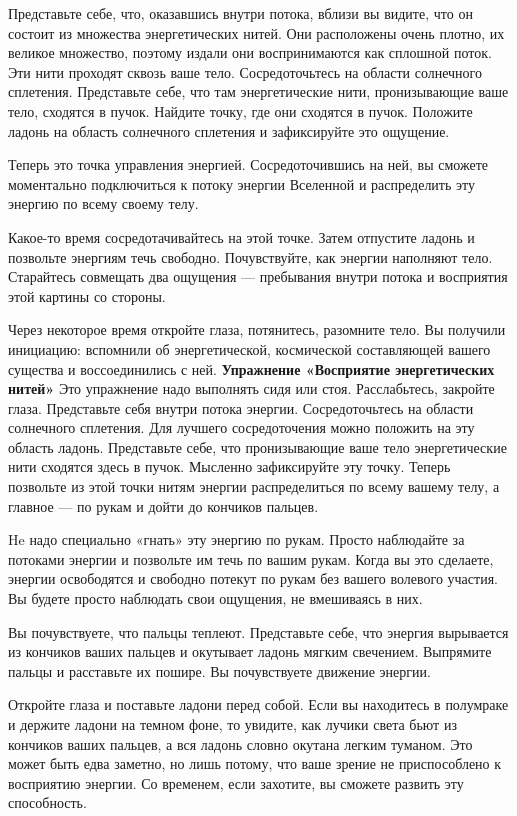 Представьте себе, что, оказавшись внутри потока, вблизи вы видите, что он состоит из множества
энергетических нитей. Они расположены очень плотно, их великое множество, поэтому издали они
воспринимаются как сплошной поток. Эти нити проходят сквозь ваше тело. Сосредоточьтесь на области солнечного сплетения. Представьте себе, что там энергетические нити, пронизывающие ваше тело, сходятся в пучок. Найдите точку, где они сходятся в пучок. Положите ладонь на область солнечного сплетения и зафиксируйте это ощущение.

Теперь это точка управления энергией. Сосредоточившись на ней, вы сможете моментально подключиться к потоку энергии Вселенной и распределить эту энергию по всему своему телу.

Какое-то время сосредотачивайтесь на этой точке. Затем отпустите ладонь и позвольте энергиям течь
свободно. Почувствуйте, как энергии наполняют тело. Старайтесь совмещать два ощущения --- пребывания внутри потока и восприятия этой картины со стороны.

Через некоторое время откройте глаза, потянитесь, разомните тело. Вы получили инициацию: вспомнили об энергетической, космической составляющей вашего существа и воссоединились с ней.
\bigskip
{\bf Упражнение «Восприятие энергетических нитей»}
\medskip
Это упражнение надо выполнять сидя или стоя. Расслабьтесь, закройте глаза. Представьте себя внутри потока энергии. Сосредоточьтесь на области солнечного сплетения. Для лучшего сосредоточения можно положить на эту область ладонь. Представьте себе, что пронизывающие ваше тело энергетические нити сходятся здесь в пучок. Мысленно зафиксируйте эту точку. Теперь позвольте из этой точки нитям энергии распределиться по всему вашему телу, а главное
--- по рукам и дойти до кончиков пальцев.

He надо специально «гнать» эту энергию по рукам. Просто наблюдайте за потоками энергии и позвольте им течь по вашим рукам. Когда вы это сделаете, энергии освободятся и свободно потекут по рукам без вашего волевого участия. Вы будете просто наблюдать свои ощущения, не вмешиваясь в них.

Вы почувствуете, что пальцы теплеют. Представьте себе, что энергия вырывается из кончиков ваших пальцев и окутывает ладонь мягким свечением. Выпрямите пальцы и расставьте их пошире. Вы почувствуете движение энергии.

Откройте глаза и поставьте ладони перед собой. Если вы находитесь в полумраке и держите ладони на
темном фоне, то увидите, как лучики света бьют из кончиков ваших пальцев, а вся ладонь словно
окутана легким туманом. Это может быть едва заметно, но лишь потому, что ваше зрение не
приспособлено к восприятию энергии. Со временем, если захотите, вы сможете развить эту способность.

